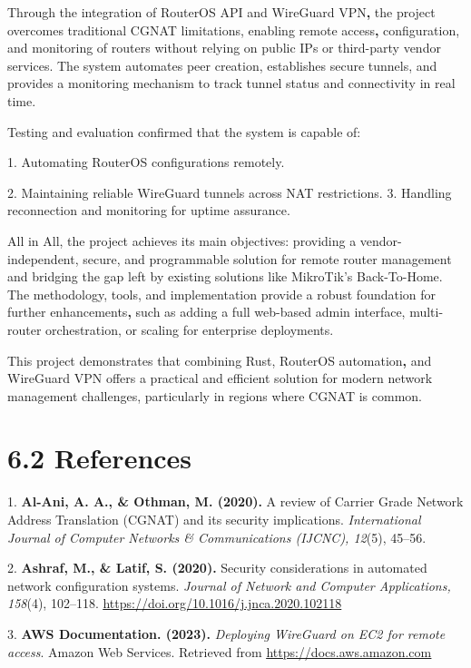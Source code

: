 \documentclass[12pt,a4paper,oneside]{report}
\begin{document}
Through the integration of RouterOS API and WireGuard VPN\textbf{, }the project overcomes traditional CGNAT limitations, enabling remote access\textbf{, }configuration, and monitoring of routers without relying on public IPs or third-party vendor services. The system automates peer creation, establishes secure tunnels, and provides a monitoring mechanism to track tunnel status and connectivity in real time.


Testing and evaluation confirmed that the system is capable of:


1. Automating RouterOS configurations remotely.


2. Maintaining reliable WireGuard tunnels across NAT restrictions. 3. Handling reconnection and monitoring for uptime assurance.




All in All, the project achieves its main objectives: providing a vendor-independent, secure, and programmable solution for remote router management and bridging the gap left by existing solutions like MikroTik's Back-To-Home. The methodology, tools, and implementation provide a robust foundation for further enhancements\textbf{, }such as adding a full web-based admin interface, multi-router orchestration, or scaling for enterprise deployments.


This project demonstrates that combining Rust, RouterOS automation\textbf{, }and WireGuard VPN offers a practical and efficient solution for modern network management challenges, particularly in regions where CGNAT is common.






\section{6.2 References}

1. \textbf{Al-Ani, A. A., \& Othman, M. (2020). }A review of Carrier Grade Network Address Translation (CGNAT) and its security implications. \textit{International Journal of Computer Networks \& Communications (IJCNC), 12}(5), 45--56.


2. \textbf{Ashraf, M., \& Latif, S. (2020). }Security considerations in automated network configuration systems. \textit{Journal of Network and Computer Applications, 158}(4), 102--118. \href{https://doi.org/10.1016/j.jnca.2020.102118}{\uline{https://doi.org/10.1016/j.jnca.2020.102118}}


3. \textbf{AWS Documentation. (2023). }\textit{Deploying WireGuard on EC2 for remote access}. Amazon Web Services. Retrieved\textit{ }from \href{https://docs.aws.amazon.com/}{\uline{https://docs.aws.amazon.com}}
\end{document}
